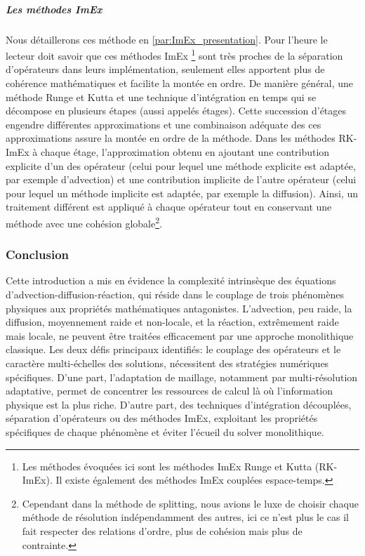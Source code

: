         \subparagraph{Les méthodes ImEx}
            Nous détaillerons ces méthode en \ref{par:ImEx_presentation}. Pour l'heure le lecteur doit savoir que ces méthodes ImEx
            \footnote{Les méthodes évoquées ici sont les méthodes ImEx Runge et Kutta (RK-ImEx). Il existe également des méthodes ImEx couplées espace-temps\cite{rebou2024}.}  \cite{pareschi2010implicitexplicitrungekuttaschemesapplications} \cite{KENNEDY2003139}
            sont très proches de la séparation d'opérateurs dans leurs implémentation, seulement elles apportent plus de cohérence mathématiques
            et facilite la montée en ordre. De manière général, une méthode Runge et Kutta et une technique d'intégration en temps 
            qui se décompose en plusieurs étapes (aussi appelés étages).
            Cette succession d'étages engendre différentes approximations et une combinaison adéquate des ces approximations assure la montée en ordre de la méthode.
            Dans les méthodes RK-ImEx à chaque étage, l'approximation obtenu en ajoutant une contribution explicite d'un des opérateur (celui pour lequel une méthode explicite est adaptée, par exemple d'advection)
            et une contribution implicite de l'autre opérateur (celui pour lequel un méthode implicite est adaptée, par exemple la diffusion).
            Ainsi, un traitement différent est appliqué à chaque opérateur tout en conservant une méthode avec une cohésion globale\footnote{Cependant dans la méthode de splitting,
            nous avions le luxe de choisir chaque méthode de résolution indépendamment des autres, ici ce n'est plus le cas il fait respecter des relations d'ordre,
            plus de cohésion mais plus de contrainte.}.

\subsubsection{Conclusion}
Cette introduction a mis en évidence la complexité intrinsèque des équations d'advection-diffusion-réaction, 
qui réside dans le couplage de trois phénomènes physiques aux propriétés mathématiques antagonistes. 
L'advection, peu raide, la diffusion, moyennement raide et non-locale, et la réaction, extrêmement raide mais locale, 
ne peuvent être traitées efficacement par une approche monolithique classique.
Les deux défis principaux identifiés: le couplage des opérateurs et le caractère multi-échelles des solutions, 
nécessitent des stratégies numériques spécifiques. 
D'une part, l'adaptation de maillage, notamment par multi-résolution adaptative, permet de concentrer les ressources de calcul là où l'information physique est la plus riche. 
D'autre part, des techniques d'intégration découplées, séparation d'opérateurs ou des méthodes ImEx, exploitant les propriétés spécifiques de chaque phénomène et éviter l'écueil du solver monolithique.
